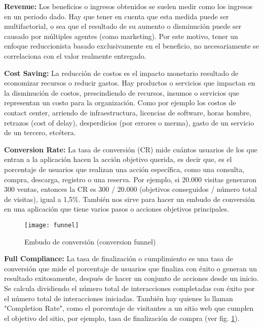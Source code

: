 \begin{description}
  \item {\textbf{Revenue:} Los beneficios o ingresos obtenidos se suelen medir como los ingresos en un periodo dado. Hay que tener en cuenta que esta medida puede ser multifactorial, o sea que el resultado de su aumento o disminución puede ser causado por múltiples agentes (como marketing). Por este motivo, tener un enfoque reduccionista basado exclusivamente en el beneficio, no necesariamente se correlaciona con el valor realmente entregado.
}

  \item {\textbf{Cost Saving:} La reducción de costos es el impacto monetario resultado de economizar recursos o reducir gastos. Hay productos o servicios que impactan en la disminución de costos, prescindiendo de recursos, insumos o servicios que representan un costo para la organización. Como por ejemplo los costos de contact center, arriendo de infraestructura, licencias de software, horas hombre, retrazos (cost of delay), desperdicios (por errores o merma), gasto de un servicio de un tercero, etcétera.
}

  \item {\textbf{Conversion Rate:} La tasa de conversión (CR) mide cuántos usuarios de los que entran a la aplicación hacen la acción objetivo querida, es decir que, es el porcentaje de usuarios que realizan una acción específica, como una consulta, compra, descarga, registro o una reserva. Por ejemplo, si 20.000 visitas generaron 300 ventas, entonces la CR es 300 / 20.000 (objetivos conseguidos / número total de visitas), igual a 1,5\%. También nos sirve para hacer un embudo de conversión en una aplicación que tiene varios pasos o acciones objetivos principales.
}

\begin{figure}[h]
  \centering
  \texttt{[image: funnel]}
  \caption{Embudo de conversión (conversion funnel)}
  \centering
  \label{fig:funnel} %
\end{figure}
\FloatBarrier %


  \item {\textbf{Full Compliance:} La tasa de finalización o cumplimiento es una tasa de conversión que mide el porcentaje de usuarios que finaliza con éxito o generan un resultado exitosamente, después de hacer un conjunto de acciones desde un inicio. Se calcula dividiendo el número total de interacciones completadas con éxito por el número total de interacciones iniciadas. También hay quienes lo llaman "Completion Rate", como el porcentaje de visitantes a un sitio web que cumplen el objetivo del sitio, por ejemplo, tasa de finalización de compra (ver fig. \ref{fig:funnel}). 
}


\end{description}
